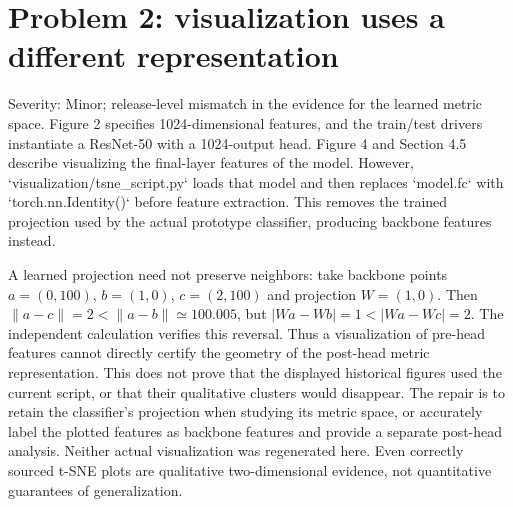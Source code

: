 \documentclass[10pt]{article}
\begin{document}
\section*{Problem 2: visualization uses a different representation}
Severity: Minor; release-level mismatch in the evidence for the learned metric space. Figure 2 specifies 1024-dimensional features, and the train/test drivers instantiate a ResNet-50 with a 1024-output head. Figure 4 and Section 4.5 describe visualizing the final-layer features of the model. However, `visualization/tsne\_script.py` loads that model and then replaces `model.fc` with `torch.nn.Identity()` before feature extraction. This removes the trained projection used by the actual prototype classifier, producing backbone features instead.\par
A learned projection need not preserve neighbors: take backbone points \(a=(0,100)\), \(b=(1,0)\), \(c=(2,100)\) and projection \(W=(1,0)\). Then \(\|a-c\|=2<\|a-b\|\simeq100.005\), but \(|Wa-Wb|=1<|Wa-Wc|=2\). The independent calculation verifies this reversal. Thus a visualization of pre-head features cannot directly certify the geometry of the post-head metric representation. This does not prove that the displayed historical figures used the current script, or that their qualitative clusters would disappear. The repair is to retain the classifier’s projection when studying its metric space, or accurately label the plotted features as backbone features and provide a separate post-head analysis. Neither actual visualization was regenerated here. Even correctly sourced t-SNE plots are qualitative two-dimensional evidence, not quantitative guarantees of generalization.\par
\end{document}
